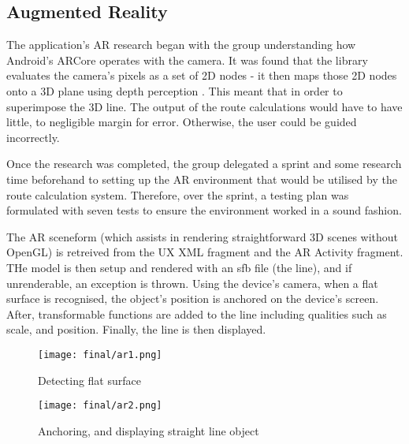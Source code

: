 \subsection{Augmented Reality}
The application's AR research began with the group understanding how Android's ARCore operates with the camera. It was found that the library evaluates the camera's pixels as a set of 2D nodes - it then maps those 2D nodes onto a 3D plane using depth perception \cite{}. This meant that in order to superimpose the 3D line. The output of the route calculations would have to have little, to negligible margin for error. Otherwise, the user could be guided incorrectly.

Once the research was completed, the group delegated a sprint and some research time beforehand to setting up the AR environment that would be utilised by the route calculation system. Therefore, over the sprint, a testing plan was formulated with seven tests to ensure the environment worked in a sound fashion.



The AR sceneform (which assists in rendering straightforward 3D scenes without OpenGL) is retreived from the UX XML fragment and the AR Activity fragment. THe model is then setup and rendered with an sfb file (the line), and if unrenderable, an exception is thrown. Using the device's camera, when a flat surface is recognised, the object's position is anchored on the device's screen. After, transformable functions are added to the line including qualities such as scale, and position. Finally, the line is then displayed.




\begin{figure}[H]
    \centering
    \begin{minipage}[b]{0.4\textwidth}
        \texttt{[image: final/ar1.png]}
        \caption{Detecting flat surface}
        \label{fig:flatsurface}
    \end{minipage}
    \qquad
    \begin{minipage}[b]{0.4\textwidth}
        \texttt{[image: final/ar2.png]}
        \caption{Anchoring, and displaying straight line object}
        \label{fig:anchor}
    \end{minipage}
\end{figure}

